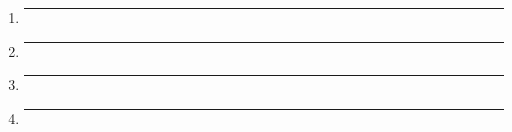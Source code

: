 \begin{enumerate}[label=\textbf{\arabic*}]
\item{
  \lipsum[13] %
  \bigbreak
  \hrule
  \bigbreak
}

\item{
  \lipsum[10]
  \bigbreak
  \hrule
  \bigbreak
}

\item{
  \lipsum[11]
  \bigbreak
  \hrule
  \bigbreak
}

\item{
  \lipsum[12]
  \bigbreak
  \hrule
  \bigbreak
}



\end{enumerate}